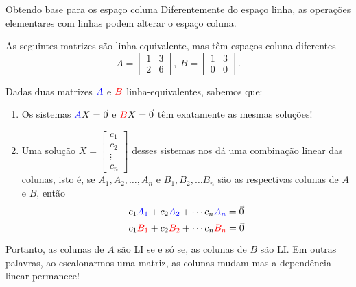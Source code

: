 \begin{frame}[label=lild]{Obtendo base para os espaço coluna}
Diferentemente do espaço linha, as operações elementares com linhas podem alterar o espaço coluna. 

\begin{exe}
As seguintes matrizes são linha-equivalente, mas têm espaços coluna diferentes
\[
A=\begin{bmatrix}
1 & 3\\ 2& 6
\end{bmatrix},\ 
B=\begin{bmatrix}
1 & 3\\ 0 & 0
\end{bmatrix}.
\]
\end{exe}

\end{frame}


\begin{frame}[label=lild]{ }
Dadas duas matrizes ${\color{blue}A}$ e ${\color{red}B}$ linha-equivalentes, sabemos que:
\begin{enumerate}
\item  Os sistemas ${\color{blue}A}X=\vec{0}$ e ${\color{red}B}X=\vec{0}$ {\color{red}têm exatamente as mesmas soluções!}
\item Uma solução $X=\begin{bmatrix}
c_1\\ c_2 \\ \vdots \\ c_n
\end{bmatrix}$ desses sistemas nos dá uma combinação linear das colunas, isto é, se {\color{blue}$A_1, A_2, \ldots, A_n$} e {\color{red}$B_1, B_2,\ldots B_n$} são as respectivas colunas de {\color{blue}$A$} e {\color{red}$B$}, então
\[c_1{\color{blue}A_1}+c_2{\color{blue}A_2}+\cdots c_n{\color{blue}A_n}=\vec{0}\]
\[c_1{\color{red}B_1}+c_2{\color{red}B_2}+\cdots c_n{\color{red}B_n}=\vec{0}\]
\end{enumerate}


Portanto, {\color{blue} as colunas de $A$ são LI se e só se, as colunas de $B$ são LI}. Em outras palavras, {\color{red} ao escalonarmos uma matriz, as colunas mudam mas a dependência linear permanece!}

\end{frame}




